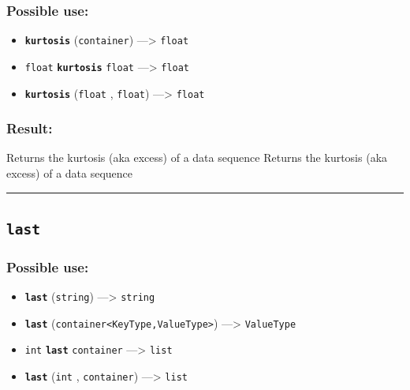\documentclass[]{book}
\providecommand{\tightlist}{%
  \setlength{\itemsep}{0pt}\setlength{\parskip}{0pt}}
\theoremstyle{definition}
\theoremstyle{definition}
\theoremstyle{definition}
\theoremstyle{remark}
\begin{document}
\subsubsection{Possible use:}\label{possible-use-315}

\begin{itemize}
\tightlist
\item
  \textbf{\texttt{kurtosis}} (\texttt{container}) ---\textgreater{}
  \texttt{float}
\item
  \texttt{float} \textbf{\texttt{kurtosis}} \texttt{float}
  ---\textgreater{} \texttt{float}
\item
  \textbf{\texttt{kurtosis}} (\texttt{float} , \texttt{float})
  ---\textgreater{} \texttt{float}
\end{itemize}

\subsubsection{Result:}\label{result-305}

Returns the kurtosis (aka excess) of a data sequence Returns the
kurtosis (aka excess) of a data sequence

\begin{center}\rule{0.5\linewidth}{\linethickness}\end{center}

\subsection{\texorpdfstring{\texttt{last}}{last}}\label{last}

\subsubsection{Possible use:}\label{possible-use-316}

\begin{itemize}
\tightlist
\item
  \textbf{\texttt{last}} (\texttt{string}) ---\textgreater{}
  \texttt{string}
\item
  \textbf{\texttt{last}}
  (\texttt{container\textless{}KeyType,ValueType\textgreater{}})
  ---\textgreater{} \texttt{ValueType}
\item
  \texttt{int} \textbf{\texttt{last}} \texttt{container}
  ---\textgreater{} \texttt{list}
\item
  \textbf{\texttt{last}} (\texttt{int} , \texttt{container})
  ---\textgreater{} \texttt{list}
\end{itemize}
\end{document}
